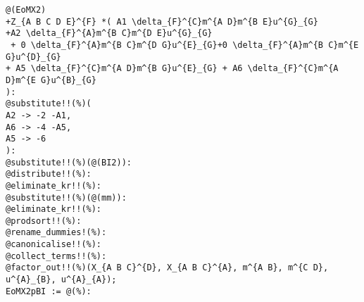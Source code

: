 \documentclass[11pt]{article}
\begin{document}
{\color[named]{Blue}\begin{verbatim}
@(EoMX2)
+Z_{A B C D E}^{F} *( A1 \delta_{F}^{C}m^{A D}m^{B E}u^{G}_{G}
+A2 \delta_{F}^{A}m^{B C}m^{D E}u^{G}_{G}
 + 0 \delta_{F}^{A}m^{B C}m^{D G}u^{E}_{G}+0 \delta_{F}^{A}m^{B C}m^{E G}u^{D}_{G} 
+ A5 \delta_{F}^{C}m^{A D}m^{B G}u^{E}_{G} + A6 \delta_{F}^{C}m^{A D}m^{E G}u^{B}_{G} 
):
@substitute!!(%)(
A2 -> -2 -A1,
A6 -> -4 -A5,
A5 -> -6
):
@substitute!!(%)(@(BI2)):
@distribute!!(%):
@eliminate_kr!!(%):
@substitute!!(%)(@(mm)):
@eliminate_kr!!(%):
@prodsort!!(%):
@rename_dummies!(%):
@canonicalise!!(%):
@collect_terms!!(%):
@factor_out!!(%)(X_{A B C}^{D}, X_{A B C}^{A}, m^{A B}, m^{C D}, u^{A}_{B}, u^{A}_{A});
EoMX2pBI := @(%):
\end{verbatim}}
\end{document}
